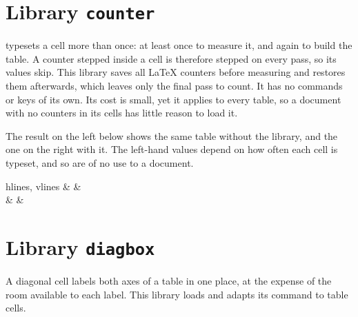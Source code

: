 \section{Library \texttt{counter}}\label{lib:counter}
 typesets a cell more than once: at least once to measure it, and again to build the table. A counter stepped inside a cell is therefore stepped on every pass, so its values skip. This library saves all \LaTeX{} counters before measuring and restores them afterwards, which leaves only the final pass to count. It has no commands or keys of its own. Its cost is small, yet it applies to every table, so a document with no counters in its cells has little reason to load it.

The result on the left below shows the same table without the library, and the one on the right with it. The left-hand values depend on how often each cell is typeset, and so are of no use to a document.

\begin{codestore}[st=lib:counter:def]
    \newcommand{\mycnt}{\stepcounter{mycnt}\arabic{mycnt}}\end{codestore}
\begin{codestore}[st=lib:counter:table]
    \begin{tblr}{hlines, vlines}
        \mycnt & \mycnt & \mycnt \\
        \mycnt & \mycnt & \mycnt
    \end{tblr}\end{codestore}
\begin{center}
    {\WithoutCounterLibrary{}}\qquad
    \setcounter{mycnt}{0}
\end{center}

\section{Library \texttt{diagbox}}\label{lib:diagbox}
A diagonal cell labels both axes of a table in one place, at the expense of the room available to each label. This library loads  and adapts its command to table cells.

